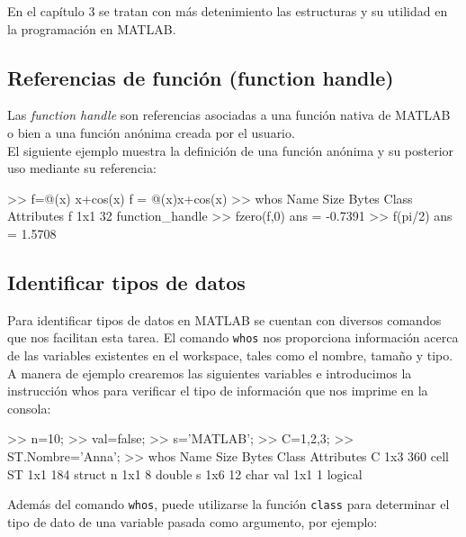 En el capítulo 3 se tratan con más detenimiento las estructuras y su
utilidad en la programación en MATLAB.

\subsection{Referencias de función (function handle)}\label{referencias-de-funcion-function-handle}

Las \emph{function handle} son referencias asociadas a una función
nativa de MATLAB o bien a una función anónima creada por el usuario.\\

El siguiente ejemplo muestra la definición de una función anónima y su
posterior uso mediante su referencia:

\begin{matlab}
>> f=@(x) x+cos(x)
f = 
    @(x)x+cos(x)
>> whos
  Name      Size            Bytes  Class              Attributes
  f         1x1                32  function_handle              
>> fzero(f,0) %
ans =
   -0.7391
>> f(pi/2) %
ans =
    1.5708
\end{matlab}

\subsection{Identificar tipos de datos}

Para identificar tipos de datos en MATLAB se cuentan con diversos
comandos que nos facilitan esta tarea. El comando \texttt{whos} nos
proporciona información acerca de las variables existentes en el
workspace, tales como el nombre, tamaño y tipo. A manera de ejemplo
crearemos las siguientes variables e introducimos la instrucción whos
para verificar el tipo de información que nos imprime en la consola:

\begin{matlab}
>> n=10;
>> val=false;
>> s='MATLAB';
>> C={1,2,3};
>> ST.Nombre='Anna';
>> whos
  Name      Size            Bytes  Class      Attributes
  C         1x3               360  cell                 
  ST        1x1               184  struct               
  n         1x1                 8  double               
  s         1x6                12  char                 
  val       1x1                 1  logical      
 
\end{matlab}

Además del comando \texttt{whos}, puede utilizarse la función
\texttt{class} para determinar el tipo de dato de una variable pasada
como argumento, por ejemplo:

